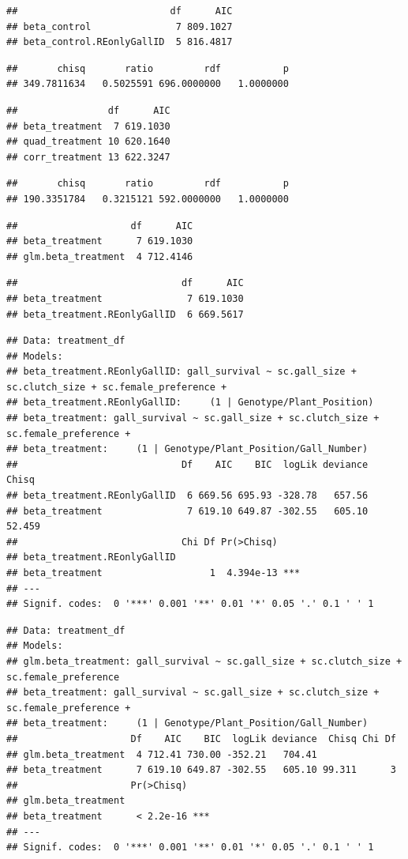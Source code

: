 \documentclass[]{elsarticle} %
\begin{document}
\begin{verbatim}
##                           df      AIC
## beta_control               7 809.1027
## beta_control.REonlyGallID  5 816.4817
\end{verbatim}

\begin{verbatim}
##       chisq       ratio         rdf           p 
## 349.7811634   0.5025591 696.0000000   1.0000000
\end{verbatim}

\begin{verbatim}
##                df      AIC
## beta_treatment  7 619.1030
## quad_treatment 10 620.1640
## corr_treatment 13 622.3247
\end{verbatim}

\begin{verbatim}
##       chisq       ratio         rdf           p 
## 190.3351784   0.3215121 592.0000000   1.0000000
\end{verbatim}

\begin{verbatim}
##                    df      AIC
## beta_treatment      7 619.1030
## glm.beta_treatment  4 712.4146
\end{verbatim}

\begin{verbatim}
##                             df      AIC
## beta_treatment               7 619.1030
## beta_treatment.REonlyGallID  6 669.5617
\end{verbatim}

\begin{verbatim}
## Data: treatment_df
## Models:
## beta_treatment.REonlyGallID: gall_survival ~ sc.gall_size + sc.clutch_size + sc.female_preference + 
## beta_treatment.REonlyGallID:     (1 | Genotype/Plant_Position)
## beta_treatment: gall_survival ~ sc.gall_size + sc.clutch_size + sc.female_preference + 
## beta_treatment:     (1 | Genotype/Plant_Position/Gall_Number)
##                             Df    AIC    BIC  logLik deviance  Chisq
## beta_treatment.REonlyGallID  6 669.56 695.93 -328.78   657.56       
## beta_treatment               7 619.10 649.87 -302.55   605.10 52.459
##                             Chi Df Pr(>Chisq)    
## beta_treatment.REonlyGallID                      
## beta_treatment                   1  4.394e-13 ***
## ---
## Signif. codes:  0 '***' 0.001 '**' 0.01 '*' 0.05 '.' 0.1 ' ' 1
\end{verbatim}

\begin{verbatim}
## Data: treatment_df
## Models:
## glm.beta_treatment: gall_survival ~ sc.gall_size + sc.clutch_size + sc.female_preference
## beta_treatment: gall_survival ~ sc.gall_size + sc.clutch_size + sc.female_preference + 
## beta_treatment:     (1 | Genotype/Plant_Position/Gall_Number)
##                    Df    AIC    BIC  logLik deviance  Chisq Chi Df
## glm.beta_treatment  4 712.41 730.00 -352.21   704.41              
## beta_treatment      7 619.10 649.87 -302.55   605.10 99.311      3
##                    Pr(>Chisq)    
## glm.beta_treatment               
## beta_treatment      < 2.2e-16 ***
## ---
## Signif. codes:  0 '***' 0.001 '**' 0.01 '*' 0.05 '.' 0.1 ' ' 1
\end{verbatim}
\end{document}
